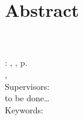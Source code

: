 \chapter*{Abstract}
\thispagestyle{empty}

\myName\\
\myTitle\\
\myLocation : \myUni , \myTime , \pageref{LastPage} p.\\
\myDegree , \mySubject\\
Supervisors: \mySupervisor\\

\noindent
to be done\ldots \\

\noindent
Keywords: \myKeywords